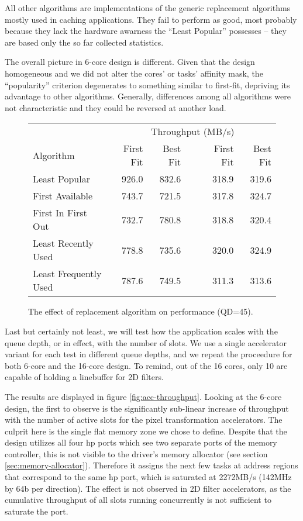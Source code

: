 All other algorithms are implementations of the generic replacement algorithms mostly used in caching applications. 
They fail to perform as good, most probably because they lack the hardware awarness the ``Least Popular'' possesses -- they are based
only the so far collected statistics.

The overall picture in 6-core design is different. 
Given that the design homogeneous and we did not alter the cores' or tasks' affinity mask, 
the ``popularity'' criterion degenerates to something similar to first-fit, depriving its advantage to other algorithms.
Generally, differences among all algorithms were not characteristic and they could be reversed at another load. 

\begin{figure}[h!]
\centering
\begin{tabular}{lrrcrr}
\toprule
	 			& \multicolumn{5}{c}{Throughput (MB/s)}\\
Algorithm			& First Fit & Best Fit &~& First Fit & Best Fit \\
\midrule
Least Popular 			& 926.0	& 832.6 &&318.9	& 319.6	\\
First Available			& 743.7	& 721.5 &&317.8	& 324.7	\\
First In First Out		& 732.7	& 780.8 &&318.8	& 320.4	\\
Least Recently Used		& 778.8	& 735.6 &&320.0	& 324.9	\\
Least Frequently Used		& 787.6	& 749.5 &&311.3	& 313.6	\\

\bottomrule		 
\end{tabular}
\caption{The effect of replacement algorithm on performance (QD=45).}
\label{tab:perf-algo}
\end{figure}

Last but certainly not least, we will test how the application scales with the queue depth, or in effect, with the number of slots.
We use a single accelerator variant for each test in different queue depths, and we repeat the proceedure for both 
6-core and the 16-core design. To remind, out of the 16 cores, only 10 are capable of holding a linebuffer for 2D filters.

The results are displayed in figure \ref{fig:acc-throughput}. Looking at the 6-core design, the first to observe is the
significantly sub-linear increase of throughput with the number of active slots for the pixel transformation accelerators.
The culprit here is the single flat memory zone we chose to define. Despite that the design utilizes all four \gls{hp} ports
which see two separate ports of the memory controller, this is not visible to the driver's memory allocator 
(see section \ref{sec:memory-allocator}). Therefore it assigns the next few tasks at address regions that correspond to the same
\gls{hp} port, which is saturated at 2272MB/s (142MHz by 64b per direction). The effect is not observed in 2D filter accelerators,
as the cumulative throughput of all slots running concurrently is not sufficient to saturate the port.

